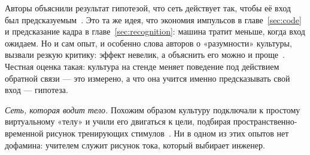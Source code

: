 Авторы объяснили результат гипотезой, что сеть действует так, чтобы её вход был предсказуемым~\cite{Friston2010}. Это та же идея, что экономия импульсов в главе~\ref{sec:code} и предсказание кадра в главе~\ref{sec:recognition}: машина тратит меньше, когда вход ожидаем. Но и сам опыт, и особенно слова авторов о «разумности» культуры, вызвали резкую критику: эффект невелик, а объяснить его можно и проще~\cite{Balci2023}. Честная оценка такая: культура на стенде меняет поведение под действием обратной связи --- это измерено, а что она учится именно предсказывать свой вход --- гипотеза.

\emph{Сеть, которая водит тело.} Похожим образом культуру подключали к простому виртуальному «телу» и учили его двигаться к цели, подбирая пространственно-временной рисунок тренирующих стимулов~\cite{Bakkum2008}. Ни в одном из этих опытов нет дофамина: учителем служит рисунок тока, который выбирает инженер.

